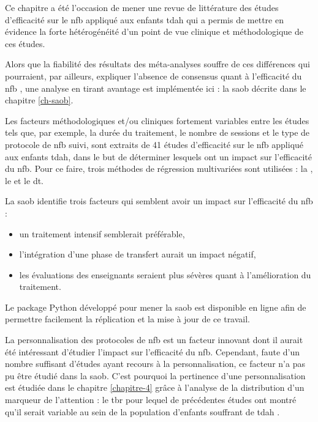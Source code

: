 Ce chapitre a été l'occasion de mener une revue de littérature des études d'efficacité sur le \gls{nfb} appliqué aux enfants \gls{tdah} 
qui a permis de mettre en évidence la forte hétérogénéité d'un point de vue clinique et méthodologique de ces études. 

Alors que la fiabilité des résultats des méta-analyses souffre de ces différences qui pourraient, par ailleurs, expliquer l'absence de consensus quant 
à l'efficacité du \gls{nfb} \citep{Alkoby2017}, une analyse en tirant avantage est implémentée ici : la \gls{saob} décrite dans le chapitre \ref{ch-saob}. 

Les facteurs méthodologiques et/ou cliniques fortement variables entre les études tels que, par exemple, la durée du traitement, le nombre de sessions et le type 
de protocole de \gls{nfb} suivi, sont extraits de 41 études d'efficacité sur le \gls{nfb} appliqué aux enfants \gls{tdah}, dans le but de déterminer lesquels 
ont un impact sur l'efficacité du \gls{nfb}. Pour ce faire, trois méthodes de régression multivariées sont utilisées : la , le  et le \gls{dt}. 

La \gls{saob} identifie trois facteurs qui semblent avoir un impact sur l'efficacité du \gls{nfb} : 
\begin{itemize}
\item un traitement intensif semblerait préférable, 
\item l'intégration d'une phase de transfert aurait un impact négatif, 
\item les évaluations des enseignants seraient plus
sévères quant à l'amélioration du traitement. 
\end{itemize}

Le package Python développé pour mener la \gls{saob} est disponible en ligne afin de permettre facilement la réplication et la mise à jour 
de ce travail. 

La personnalisation des protocoles de \gls{nfb} est un facteur innovant dont il aurait été intéressant d'étudier l'impact sur l'efficacité du \gls{nfb}.  
Cependant, faute d'un nombre suffisant d'études ayant recours à la personnalisation, ce facteur n'a pas pu être étudié dans la \gls{saob}. C'est pourquoi
la pertinence d'une personnalisation est étudiée dans le chapitre \ref{chapitre-4} grâce à l'analyse de la distribution d'un marqueur de l'attention : 
le \gls{tbr} pour lequel de précédentes études ont montré qu'il serait variable au sein de la population d'enfants souffrant de \gls{tdah} \citep{Zhang2017, Arns2013, Clarke2001}.

